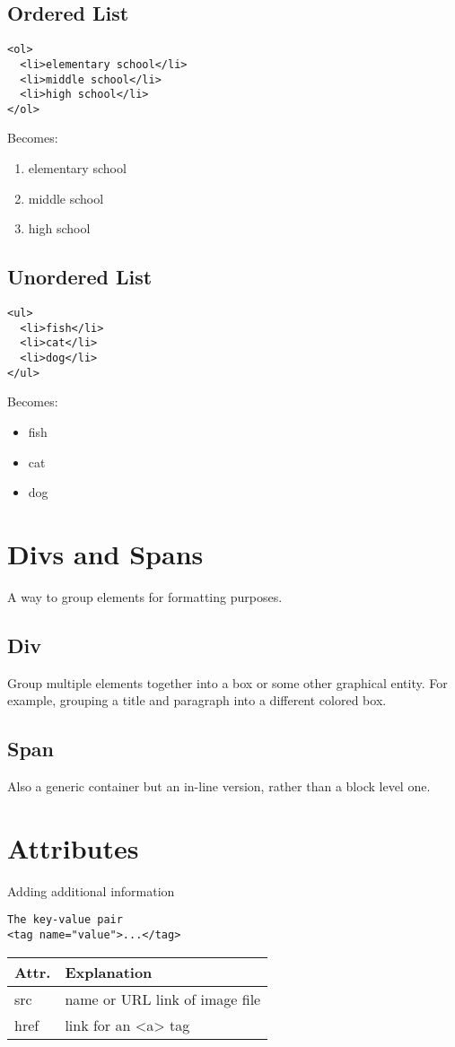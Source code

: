 \documentclass{article}
\begin{document}
\subsection{Ordered List}
\begin{verbatim}
<ol>
  <li>elementary school</li>
  <li>middle school</li>
  <li>high school</li>
</ol>
\end{verbatim}
Becomes:
\begin{enumerate}
	\itemsep0em
	\item elementary school
	\item middle school
	\item high school
\end{enumerate}
\subsection{Unordered List}
\begin{verbatim}
<ul>
  <li>fish</li>
  <li>cat</li>
  <li>dog</li>
</ul>
\end{verbatim}
Becomes:
\begin{itemize}
	\itemsep0em
	\item fish
	\item cat
	\item dog
\end{itemize}

\section{Divs and Spans}
A way to group elements for formatting purposes.
\subsection{Div}
Group multiple elements together into a box or some other graphical entity. For example, grouping a title and paragraph into a different colored box.
\subsection{Span}
Also a generic container but an in-line version, rather than a block level one.

\section{Attributes}
Adding additional information
\begin{verbatim}
The key-value pair
<tag name="value">...</tag>
\end{verbatim}

\begin{center}
	\begin{tabular}{| l | p{10cm} |}
		\hline
		\textbf{Attr.} & \textbf{Explanation} \\ \hline
		src & name or URL link of image file \\ \hline
		href & link for an <a> tag \\ \hline
	\end{tabular}
\end{center}
\end{document}
